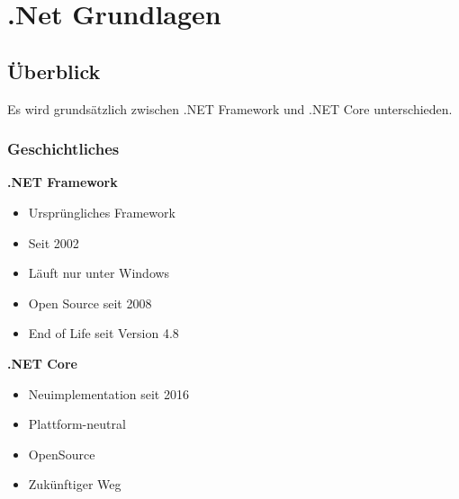 
\section{.Net Grundlagen}
\subsection{Überblick}
    Es wird grundsätzlich zwischen \textcolor{OSTPink}{.NET Framework} und \textcolor{OSTPink}{.NET Core} unterschieden.
\subsubsection{Geschichtliches}
    \vspace{-10pt}
    \begin{multicols}{2}
    \textbf{\textcolor{OSTPink}{.NET Framework}}
    \begin{itemize}
        \item Ursprüngliches Framework
        \item Seit 2002
        \item Läuft nur unter Windows
        \item Open Source seit 2008
        \item End of Life seit Version 4.8
    \end{itemize}

    \columnbreak

    \textbf{\textcolor{OSTPink}{.NET Core}}

    \begin{itemize}
        \item Neuimplementation seit 2016
        \item Plattform-neutral
        \item OpenSource
        \item Zukünftiger Weg
    \end{itemize}
    \end{multicols}

